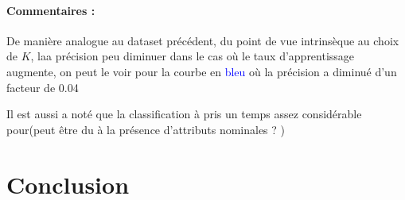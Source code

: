 		\paragraph{Commentaires : }
		De manière analogue au dataset précédent, du point de vue intrinsèque au choix de $K$, laa précision peu diminuer dans le cas où le taux d'apprentissage augmente, on peut le voir pour la courbe en \textcolor{blue}{bleu} où la précision a diminué d'un facteur de 0.04
		\par Il est aussi a noté que la classification à pris un temps assez considérable pour(peut être du à la présence d'attributs nominales ? )
	\section{Conclusion}
